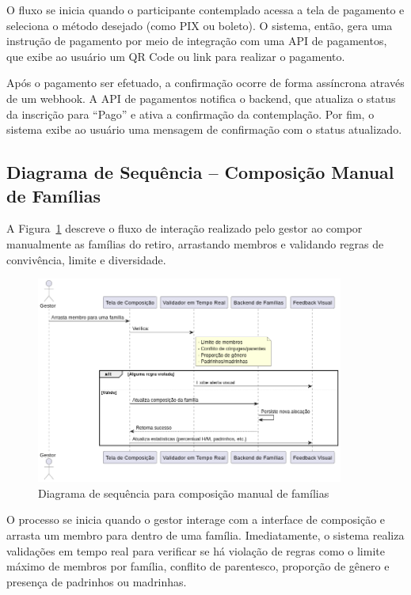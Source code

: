 O fluxo se inicia quando o participante contemplado acessa a tela de pagamento e seleciona o método desejado (como PIX ou boleto). O sistema, então, gera uma instrução de pagamento por meio de integração com uma API de pagamentos, que exibe ao usuário um QR Code ou link para realizar o pagamento.

Após o pagamento ser efetuado, a confirmação ocorre de forma assíncrona através de um webhook. A API de pagamentos notifica o backend, que atualiza o status da inscrição para “Pago” e ativa a confirmação da contemplação. Por fim, o sistema exibe ao usuário uma mensagem de confirmação com o status atualizado.

\subsection{Diagrama de Sequência – Composição Manual de Famílias}

A Figura~\ref{fig:familyManualComposition} descreve o fluxo de interação realizado pelo gestor ao compor manualmente as famílias do retiro, arrastando membros e validando regras de convivência, limite e diversidade.

\begin{figure}[H]
    \centering
    \includegraphics[width=0.9\textwidth]{images/diagramasdesequencias/familiyComposition.png}
    \caption{Diagrama de sequência para composição manual de famílias}
    \label{fig:familyManualComposition}
\end{figure}

O processo se inicia quando o gestor interage com a interface de composição e arrasta um membro para dentro de uma família. Imediatamente, o sistema realiza validações em tempo real para verificar se há violação de regras como o limite máximo de membros por família, conflito de parentesco, proporção de gênero e presença de padrinhos ou madrinhas.


